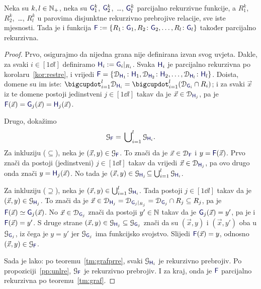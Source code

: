 \begin{teorem}\label{tm:gre}
Neka su $k,l\in{\mathbb N}_+$, neka su $\f G_1^k$, $\f G_2^k$,~\ldots, $\f G_l^k$ parcijalno rekurzivne funkcije, a $R_1^k$, $R_2^k$,~\ldots, $R_l^k$ u parovima disjunktne rekurzivno prebrojive relacije, sve iste mjesnosti. Tada je i funkcija $\f F:=\{R_1\colon\f G_1,R_2\colon\f G_2,\dotsc,R_l\colon\f G_l\}$ također parcijalno rekurzivna.
\end{teorem}
\begin{proof}
Prvo, osigurajmo da nijedna grana nije definirana izvan svog uvjeta. Dakle, za svaki $i\in[1\dd l]$ definiramo $\f H_i:=\f G_i|_{R_i}$. Svaka $\f H_i$ je parcijalno rekurzivna po korolaru~\ref{kor:restre}, i vrijedi $\f F=\{\dom{\f H_1}\colon\f H_1,\dom{\f H_2}\colon\f H_2,\dotsc,\dom{\f H_l}\colon\f H_l\}$. Doista, domene su im iste: $\bdcup_{i=1}^l\dom{\f H_i}=\bdcup_{i=1}^l(\dom{\f G_i}\cap R_i)$; i za svaki $\vec x$ iz te domene postoji jedinstveni $j\in[1\dd l]$ takav da je $\vec x\in\dom{\f H_{j}}$, pa je $\f F(\vec x)=\f G_{j}(\vec x)=\f H_{j}(\vec x)$.

Drugo, dokažimo
\begin{equation}
    \graf{\f F}=\,\bigcup\nolimits_{i=1}^l\graf{\f H_i}\text.
\end{equation}
Za inkluziju ($\subseteq$), neka je $(\vec x,y)\in\graf{\f F}$. To znači da je $\vec x\in\dom{\f F}$ i $y=\f F(\vec x)$. Prvo znači da postoji (jedinstveni) $j\in[1\dd l]$ takav da vrijedi $\vec x\in\dom{\f H_{j}}$, pa ovo drugo onda znači $y=\f H_{j}(\vec x)$. No tada je $(\vec x,y)\in\graf{\f H_{j}}\!\subseteq\bigcup_{i=1}^l\graf{\f H_i}$.

Za inkluziju ($\supseteq$), neka je $(\vec x,y)\in\bigcup_{i=1}^l\graf{\f H_i}$. Tada postoji $j\in[1\dd l]$ takav da je $(\vec x,y)\in\graf{\f H_j}$. To znači da je $\vec x\in\dom{\f H_j}=\dom{\f G_j|_{R_j}}=\dom{\f G_j}\cap R_j\subseteq R_j$, pa je $\f F(\vec x)\simeq\f G_j(\vec x)$. No $\vec x\in\dom{\f G_j}$ znači da postoji $y'\in{\mathbb N}$ takav da je $\f G_j(\vec x)=y'$, pa je i $\f F(\vec x)=y'$. S druge strane $(\vec x,y)\in\graf{\f H_j}\subseteq\graf{\f G_j}$ znači da su $(\vec x,y)$ i $(\vec x,y')$ oba u $\graf{\f G_j}$, iz čega je $y=y'$ jer $\graf{\f G_j}$ ima funkcijsko svojstvo. Slijedi $\f F(\vec x)=y$, odnosno $(\vec x,y)\in\graf{\f F}$.

Sada je lako: po teoremu~\ref{tm:grafprre}, svaki $\graf{\f H_i}$ je rekurzivno prebrojiv. Po propoziciji~\ref{pp:unlre}, $\graf{\f F}$ je rekurzivno prebrojiv. I za kraj, onda je $\f F$ parcijalno rekurzivna po teoremu~\ref{tm:graf}.
\end{proof}

